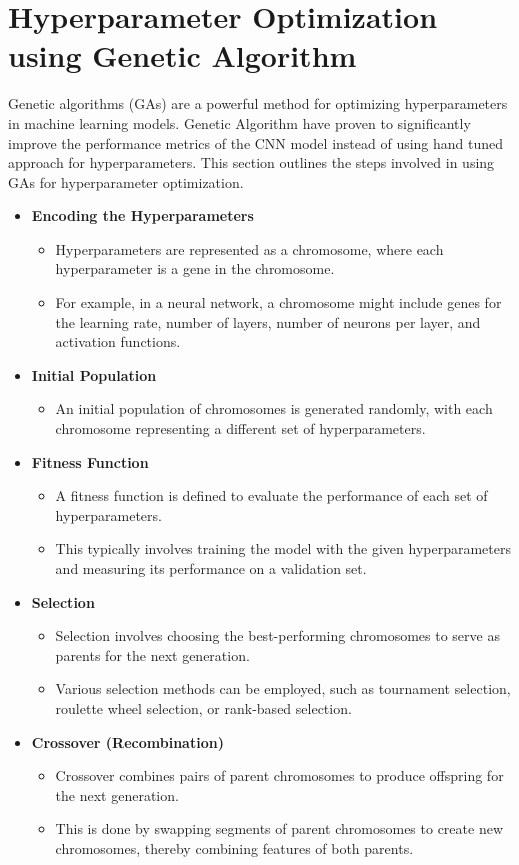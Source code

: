 \section{Hyperparameter Optimization using Genetic Algorithm}
Genetic algorithms (GAs) are a powerful method for optimizing hyperparameters in machine learning models. Genetic Algorithm have proven to significantly improve the performance metrics of the CNN model instead of using hand tuned approach for hyperparameters. This section outlines the steps involved in using GAs for hyperparameter optimization\cite{9058307}.
\begin{itemize}
    \item \textbf{Encoding the Hyperparameters}
    \begin{itemize}
        \item Hyperparameters are represented as a chromosome, where each hyperparameter is a gene in the chromosome.
        \item For example, in a neural network, a chromosome might include genes for the learning rate, number of layers, number of neurons per layer, and activation functions.
    \end{itemize}


    \item \textbf{Initial Population}
    \begin{itemize}
        \item An initial population of chromosomes is generated randomly, with each chromosome representing a different set of hyperparameters.
    \end{itemize}

    \item \textbf{Fitness Function}
    \begin{itemize}
        \item A fitness function is defined to evaluate the performance of each set of hyperparameters.
        \item This typically involves training the model with the given hyperparameters and measuring its performance on a validation set.
    \end{itemize}

    \item \textbf{Selection}
    \begin{itemize}
        \item Selection involves choosing the best-performing chromosomes to serve as parents for the next generation.
        \item Various selection methods can be employed, such as tournament selection, roulette wheel selection, or rank-based selection.
    \end{itemize}
    \newpage
    \item \textbf{Crossover (Recombination)}
    \begin{itemize}
        \item Crossover combines pairs of parent chromosomes to produce offspring for the next generation.
        \item This is done by swapping segments of parent chromosomes to create new chromosomes, thereby combining features of both parents.
    \end{itemize}


\end{itemize}

